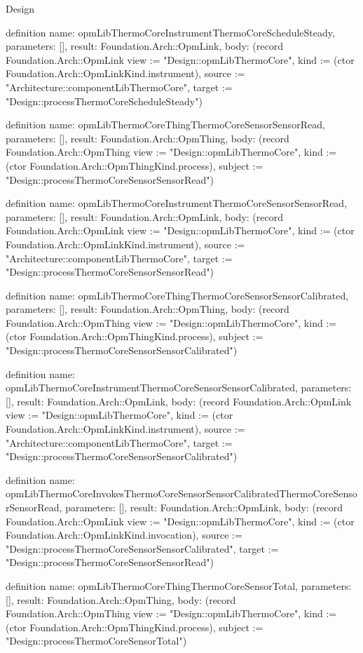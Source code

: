 \begin{lexlean}{Design}
\begin{semanticmodule}
definition{
  name: opmLibThermoCoreInstrumentThermoCoreScheduleSteady,
  parameters: [],
  result: Foundation.Arch::OpmLink,
  body: (record Foundation.Arch::OpmLink {view := "Design::opmLibThermoCore", kind := (ctor Foundation.Arch::OpmLinkKind.instrument), source := "Architecture::componentLibThermoCore", target := "Design::processThermoCoreScheduleSteady"})
}

definition{
  name: opmLibThermoCoreThingThermoCoreSensorSensorRead,
  parameters: [],
  result: Foundation.Arch::OpmThing,
  body: (record Foundation.Arch::OpmThing {view := "Design::opmLibThermoCore", kind := (ctor Foundation.Arch::OpmThingKind.process), subject := "Design::processThermoCoreSensorSensorRead"})
}

definition{
  name: opmLibThermoCoreInstrumentThermoCoreSensorSensorRead,
  parameters: [],
  result: Foundation.Arch::OpmLink,
  body: (record Foundation.Arch::OpmLink {view := "Design::opmLibThermoCore", kind := (ctor Foundation.Arch::OpmLinkKind.instrument), source := "Architecture::componentLibThermoCore", target := "Design::processThermoCoreSensorSensorRead"})
}

definition{
  name: opmLibThermoCoreThingThermoCoreSensorSensorCalibrated,
  parameters: [],
  result: Foundation.Arch::OpmThing,
  body: (record Foundation.Arch::OpmThing {view := "Design::opmLibThermoCore", kind := (ctor Foundation.Arch::OpmThingKind.process), subject := "Design::processThermoCoreSensorSensorCalibrated"})
}

definition{
  name: opmLibThermoCoreInstrumentThermoCoreSensorSensorCalibrated,
  parameters: [],
  result: Foundation.Arch::OpmLink,
  body: (record Foundation.Arch::OpmLink {view := "Design::opmLibThermoCore", kind := (ctor Foundation.Arch::OpmLinkKind.instrument), source := "Architecture::componentLibThermoCore", target := "Design::processThermoCoreSensorSensorCalibrated"})
}

definition{
  name: opmLibThermoCoreInvokesThermoCoreSensorSensorCalibratedThermoCoreSensorSensorRead,
  parameters: [],
  result: Foundation.Arch::OpmLink,
  body: (record Foundation.Arch::OpmLink {view := "Design::opmLibThermoCore", kind := (ctor Foundation.Arch::OpmLinkKind.invocation), source := "Design::processThermoCoreSensorSensorCalibrated", target := "Design::processThermoCoreSensorSensorRead"})
}

definition{
  name: opmLibThermoCoreThingThermoCoreSensorTotal,
  parameters: [],
  result: Foundation.Arch::OpmThing,
  body: (record Foundation.Arch::OpmThing {view := "Design::opmLibThermoCore", kind := (ctor Foundation.Arch::OpmThingKind.process), subject := "Design::processThermoCoreSensorTotal"})
}


\end{semanticmodule}
\end{lexlean}

